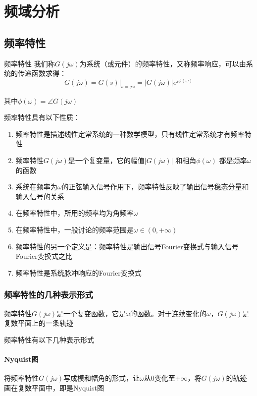 \chapter{频域分析}

\section{频率特性}

\begin{definition}{频率特性}
    \label{frequency-characteristics}
    我们称$G(j\omega)$为系统（或元件）的频率特性，又称频率响应，可以由系统的传递函数求得：
    \begin{equation*}
        G(j\omega) = G(s)|_{s=j\omega} = \left\lvert G(j\omega) \right\rvert e^{j\phi(\omega)} 
    \end{equation*}

    其中$\phi(\omega) = \angle G(j\omega)$

    频率特性具有以下性质：
    \begin{enumerate}
        \item 频率特性是描述线性定常系统的一种数学模型，只有线性定常系统才有频率特性
        \item 频率特性$G(j\omega)$是一个复变量，它的幅值$\left\lvert G(j\omega) \right\rvert $ 和相角$\phi(\omega)$ 都是频率$\omega$的函数
        \item 系统在频率为$\omega$的正弦输入信号作用下，频率特性反映了输出信号稳态分量和输入信号的关系
        \item 在频率特性中，所用的频率均为角频率$\omega$
        \item 在频率特性中，一般讨论的频率范围是$\omega \in (0,+\infty)$
        \item 频率特性的另一个定义是：频率特性是输出信号Fourier变换式与输入信号Fourier变换式之比
        \item 频率特性是系统脉冲响应的Fourier变换式
    \end{enumerate}
\end{definition}

\subsection{频率特性的几种表示形式}

频率特性$G(j\omega)$是一个复变函数，它是$\omega$的函数。对于连续变化的$\omega$，$G(j\omega)$是复数平面上的一条轨迹

频率特性有以下几种表示形式
\subsubsection{Nyquist图}
将频率特性$G(j\omega)$写成模和幅角的形式，让$\omega$从0变化至$+\infty$，将$G(j\omega)$的轨迹画在复数平面中，即是Nyquist图

